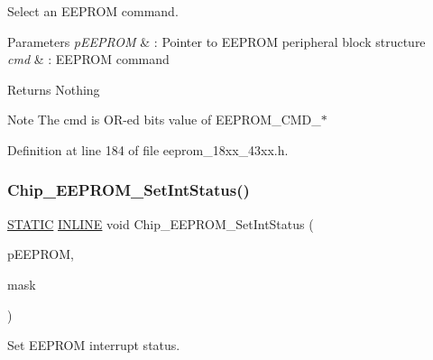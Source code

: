 Select an E\+E\+P\+R\+OM command. 


\begin{DoxyParams}{Parameters}
{\em p\+E\+E\+P\+R\+OM} & \+: Pointer to E\+E\+P\+R\+OM peripheral block structure \\
\hline
{\em cmd} & \+: E\+E\+P\+R\+OM command \\
\hline
\end{DoxyParams}
\begin{DoxyReturn}{Returns}
Nothing 
\end{DoxyReturn}
\begin{DoxyNote}{Note}
The cmd is O\+R-\/ed bits value of E\+E\+P\+R\+O\+M\+\_\+\+C\+M\+D\+\_\+$\ast$ 
\end{DoxyNote}


Definition at line 184 of file eeprom\+\_\+18xx\+\_\+43xx.\+h.

\mbox{\label{group___e_e_p_r_o_m__18_x_x__43_x_x_gacebf288107d6f4a68f805a063205cf8e}} 
\subsubsection{\texorpdfstring{Chip\+\_\+\+E\+E\+P\+R\+O\+M\+\_\+\+Set\+Int\+Status()}{Chip\_EEPROM\_SetIntStatus()}}
{\footnotesize\ttfamily \hyperlink{group___l_p_c___types___public___macros_ga10b2d890d871e1489bb02b7e70d9bdfb}{S\+T\+A\+T\+IC} \hyperlink{spifi__18xx__43xx_8h_a2eb6f9e0395b47b8d5e3eeae4fe0c116}{I\+N\+L\+I\+NE} void Chip\+\_\+\+E\+E\+P\+R\+O\+M\+\_\+\+Set\+Int\+Status (\begin{DoxyParamCaption}\item[{\hyperlink{struct_l_p_c___e_e_p_r_o_m___t}{L\+P\+C\+\_\+\+E\+E\+P\+R\+O\+M\+\_\+T} $\ast$}]{p\+E\+E\+P\+R\+OM,  }\item[{uint32\+\_\+t}]{mask }\end{DoxyParamCaption})}



Set E\+E\+P\+R\+OM interrupt status. 


